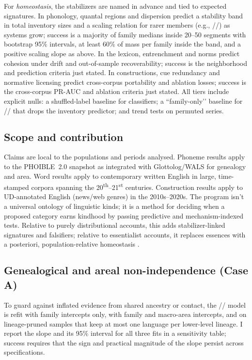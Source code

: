 \documentclass[12pt]{article}
\begin{document}
For \emph{homeostasis}, the stabilizers are named in advance and tied to expected signatures. In phonology, quantal regions and dispersion predict a stability band in total inventory sizes and a scaling relation for rarer members (e.g., //) as systems grow; success is a majority of family medians inside 20–50 segments with bootstrap 95\% intervals, at least 60\% of mass per family inside the band, and a positive scaling slope as above. In the lexicon, entrenchment and norms predict cohesion under drift and out-of-sample recoverability; success is the neighborhood and prediction criteria just stated. In constructions, cue redundancy and normative licensing predict cross-corpus portability and ablation losses; success is the cross-corpus PR-AUC and ablation criteria just stated. All tiers include explicit nulls: a shuffled-label baseline for classifiers; a ``family-only’’ baseline for // that drops the inventory predictor; and trend tests on permuted series.

\subsection*{Scope and contribution}

Claims are local to the populations and periods analysed. Phoneme results apply to the PHOIBLE~2.0 snapshot as integrated with Glottolog/WALS for genealogy and area. Word results apply to contemporary written English in large, time-stamped corpora spanning the 20\textsuperscript{th}–21\textsuperscript{st} centuries. Construction results apply to UD-annotated English (news/web genres) in the 2010s–2020s. The program isn't a universal ontology of linguistic kinds; it is a method for deciding when a proposed category earns kindhood by passing predictive and mechanism-indexed tests. Relative to purely distributional accounts, this adds stabilizer-linked signatures and falsifiers; relative to essentialist accounts, it replaces essences with a posteriori, population-relative homeostasis \citep{WilsonBarkerBrigandt2007,Khalidi2013}.

\subsection*{Genealogical and areal non-independence (Case A)}

To guard against inflated evidence from shared ancestry or contact, the // model is refit with family intercepts only, with family and macro-area intercepts, and on lineage-pruned samples that keep at most one language per lower-level lineage. I report the slope and its 95\% interval for all three fits in a sensitivity table; success requires that the sign and practical magnitude of the slope persist across specifications.
\end{document}
